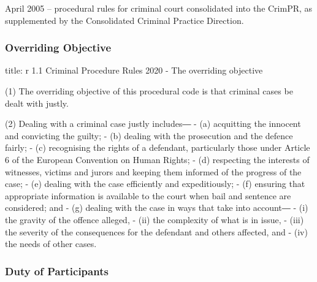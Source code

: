 \documentclass[
]{article}
\newenvironment{Shaded}{}{}
\newcommand{\NormalTok}[1]{#1}
\begin{document}
April 2005 -- procedural rules for criminal court consolidated into the
CrimPR, as supplemented by the Consolidated Criminal Practice Direction.

\hypertarget{overriding-objective}{%
\subsubsection{Overriding Objective}\label{overriding-objective}}

\begin{Shaded}
\begin{Highlighting}[]
\NormalTok{title: r 1.1 Criminal Procedure Rules 2020 {-} The overriding objective}

\NormalTok{(1) The overriding objective of this procedural code is that criminal cases be dealt with justly.}

\NormalTok{(2) Dealing with a criminal case justly includes―}
\NormalTok{{-} (a) acquitting the innocent and convicting the guilty;}
\NormalTok{{-} (b) dealing with the prosecution and the defence fairly;}
\NormalTok{{-} (c) recognising the rights of a defendant, particularly those under Article 6 of the European Convention on Human Rights;}
\NormalTok{{-} (d) respecting the interests of witnesses, victims and jurors and keeping them informed of the progress of the case;}
\NormalTok{{-} (e) dealing with the case efficiently and expeditiously;}
\NormalTok{{-} (f) ensuring that appropriate information is available to the court when bail and sentence are considered; and}
\NormalTok{{-} (g) dealing with the case in ways that take into account―}
\NormalTok{    {-} (i) the gravity of the offence alleged,}
\NormalTok{    {-} (ii) the complexity of what is in issue,}
\NormalTok{    {-} (iii) the severity of the consequences for the defendant and others affected, and}
\NormalTok{    {-} (iv) the needs of other cases. }
\end{Highlighting}
\end{Shaded}

\hypertarget{duty-of-participants}{%
\subsubsection{Duty of Participants}\label{duty-of-participants}}
\end{document}
